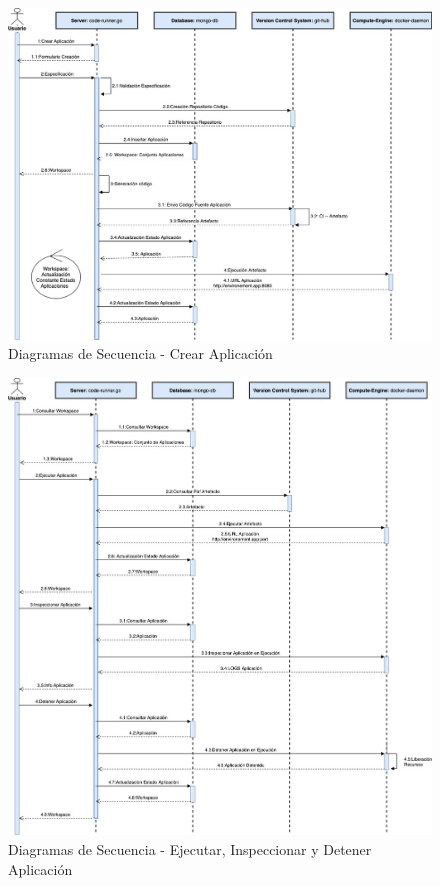 \documentclass[a4paper,11pt]{book}
\begin{document}
\begin{figure}[H]
\centering
\includegraphics[scale=0.43]{imagenes/secuencia2.jpg}
\caption{ Diagramas de Secuencia - Crear Aplicación~\cite{diagrama}  }
\label{s2}
\end{figure}


\begin{figure}[H]
\centering
\includegraphics[scale=0.43]{imagenes/secuencia3.jpg}
\caption{ Diagramas de Secuencia - Ejecutar, Inspeccionar y Detener Aplicación~\cite{diagrama}  }
\label{s3}
\end{figure}
\end{document}
